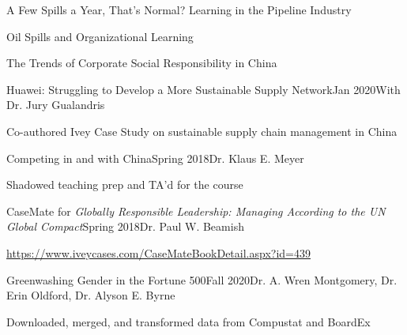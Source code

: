 \documentclass{gradstudentresume}
\begin{document}
	\begin{pres}{A Few Spills a Year, That's Normal? Learning in the Pipeline Industry}
		\item {}
	\end{pres}

	\begin{pres}{Oil Spills and Organizational Learning}
		\item {}
	\end{pres}

	\begin{pres}{The Trends of Corporate Social Responsibility in China}
		\item {}
	\end{pres}



	\largespace

	\begin{desc}{Huawei: Struggling to Develop a More Sustainable Supply Network}{Jan 2020}{With Dr. Jury Gualandris}
		\item Co-authored Ivey Case Study on sustainable supply chain management in China
	\end{desc}

	\begin{desc}{Competing in and with China}{Spring 2018}{Dr. Klaus E. Meyer}
		\item Shadowed teaching prep and TA'd for the course
	\end{desc}

	\begin{desc}{CaseMate for \textit{Globally Responsible Leadership: Managing According to the UN Global Compact}}{Spring 2018}{Dr. Paul W. Beamish}
		\item \url{https://www.iveycases.com/CaseMateBookDetail.aspx?id=439}
	\end{desc}



	\largespace

	\begin{desc}{Greenwashing Gender in the Fortune 500}{Fall 2020}{Dr. A. Wren Montgomery, Dr. Erin Oldford, Dr. Alyson E. Byrne}
		\item Downloaded, merged, and transformed data from Compustat and BoardEx	
	\end{desc}
\end{document}
